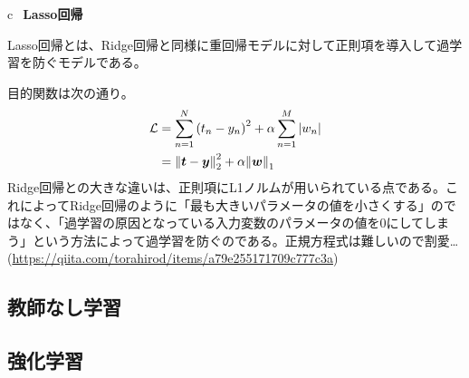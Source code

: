 \documentclass[uplatex,12pt,dvipdfmx]{jsarticle}
\begin{document}
\noindent\textcircled{c}~\textbf{Lasso回帰}

Lasso回帰とは、Ridge回帰と同様に重回帰モデルに対して正則項を導入して過学習を防ぐモデルである。

目的関数は次の通り。
\begin{align}
    \mathcal{L}&=\sum_{n=1}^{N}\qty(t_n-y_n)^2+\alpha\sum_{n=1}^{M}\abs{w_n} \\
    &=\norm{\bm{t}-\bm{y}}^2_2+\alpha\norm{\bm{w}}_1
\end{align}
Ridge回帰との大きな違いは、正則項にL1ノルムが用いられている点である。これによってRidge回帰のように「最も大きいパラメータの値を小さくする」のではなく、「過学習の原因となっている入力変数のパラメータの値を0にしてしまう」という方法によって過学習を防ぐのである。正規方程式は難しいので割愛\dots(\url{https://qiita.com/torahirod/items/a79e255171709c777c3a})

\subsection{教師なし学習}

\subsection{強化学習}
\end{document}

